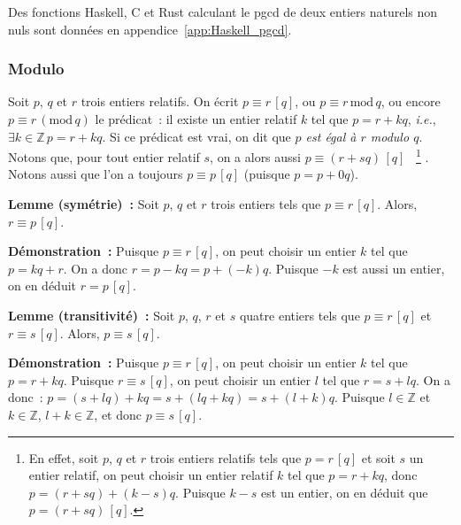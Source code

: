    \done 

\medskip

Des fonctions Haskell, C et Rust calculant le pgcd de deux entiers naturels non nuls sont données en appendice~\ref{app:Haskell_pgcd}. 

\subsubsection{Modulo}

Soit $p$, $q$ et $r$ trois entiers relatifs. 
On écrit $p \equiv r \, [q]$, ou $p \equiv r \, \mathrm{mod} \, q$, ou encore $p \equiv r \, ( \mathrm{mod} \, q)$ le prédicat : il existe un entier relatif $k$ tel que $p = r + k q$, \textit{i.e.}, $\exists k \in \mathbb{Z} \, p = r + k q$. 
Si ce prédicat est vrai, on dit que \textit{$p$ est égal à $r$ modulo $q$}.
Notons que, pour tout entier relatif $s$, on a alors aussi $p \equiv (r + s q) \, [q]$%
~\footnote{
    En effet, soit $p$, $q$ et $r$ trois entiers relatifs tels que $p = r \, [q]$ et soit $s$ un entier relatif, on peut choisir un entier relatif $k$ tel que $p = r + k q$, donc $p = (r + s q) + (k - s) q$. 
    Puisque $k-s$ est un entier, on en déduit que $p = (r + s q) \, [q]$.
}%
.
Notons aussi que l'on a toujours $p \equiv p \, [q]$ (puisque $p = p + 0 q$). 

\medskip 

\noindent\textbf{Lemme (symétrie) :} Soit $p$, $q$ et $r$ trois entiers tels que $p \equiv r \, [q]$.
    Alors, $r \equiv p \, [q]$.

\medskip 
    
\noindent\textbf{Démonstration :} 
    Puisque $p \equiv r \, [q]$, on peut choisir un entier $k$ tel que $p = k q + r$.
    On a donc $r = p - k q = p + (-k) q$. 
    Puisque $-k$ est aussi un entier, on en déduit $r = p \, [q]$.

\medskip 

\noindent\textbf{Lemme (transitivité) :} Soit $p$, $q$, $r$ et $s$ quatre entiers tels que $p \equiv r \, [q]$ et $r \equiv s \, [q]$.
    Alors, $p \equiv s \, [q]$.

\medskip 
    
\noindent\textbf{Démonstration :} 
    Puisque $p \equiv r \, [q]$, on peut choisir un entier $k$ tel que $p = r + k q$.
    Puisque $r \equiv s \, [q]$, on peut choisir un entier $l$ tel que $r = s + l q$.
    On a donc : $p = (s + l q) + k q = s + (l q + k q) = s + (l + k) q$.
    Puisque $l \in \mathbb{Z}$ et $k \in \mathbb{Z}$, $l + k \in \mathbb{Z}$, et donc $p \equiv s \, [q]$.

